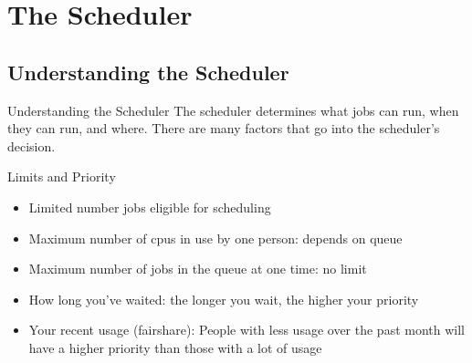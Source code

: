 \documentclass{beamer}
\begin{document}
\section{The Scheduler}
\subsection{Understanding the Scheduler}
\begin{frame}{Understanding the Scheduler}
The scheduler determines what jobs can run, when they can run, and where.  There
are many factors that go into the scheduler's decision.
   \begin{block}{Limits and Priority}
    \begin{itemize}
    \item<1-> Limited number jobs eligible for scheduling
    \item<1-> Maximum number of cpus in use by one person: depends on queue
    \item<1-> Maximum number of jobs in the queue at one time: no limit
    \end{itemize}
    \begin{itemize}
    \item<2-> How long you've waited: the longer you wait, the higher your priority
    \item<2-> Your recent usage (fairshare): People with less usage over the past month will have a higher priority than those with a lot of usage

    \end{itemize}
   \end{block}
\end{frame}
\end{document}
